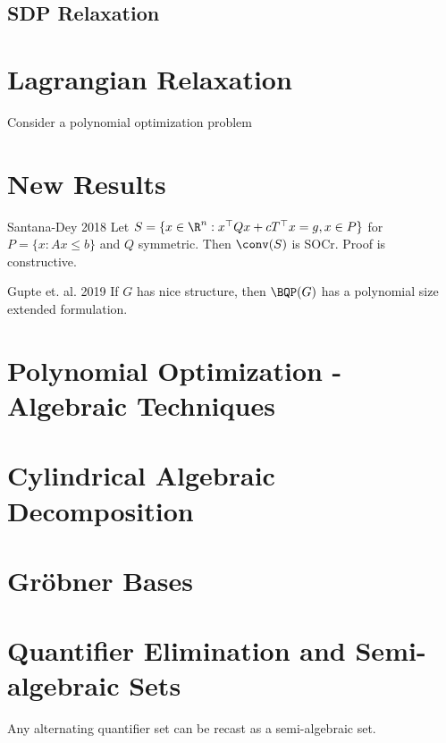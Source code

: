 \subsection{SDP Relaxation}



\section{Lagrangian Relaxation}


Consider a polynomial optimization problem 

\section{New Results}

\begin{theorem}{Santana-Dey 2018}{}
Let $S = \{x \in \R^n : x^\top Q x + cT^\top x = g, x \in P\}$  for $P = \{x : Ax \leq b\}$ and $Q$ symmetric.  Then $\conv(S)$ is SOCr.  Proof is constructive.
\end{theorem}

\begin{theorem}{Gupte et. al. 2019}{}
If $G$ has nice structure, then $\BQP(G)$ has a polynomial size extended formulation.
\end{theorem}
\section{Polynomial Optimization - Algebraic Techniques}

\section{Cylindrical Algebraic Decomposition}


\section{Gr\"obner Bases}

\section{Quantifier Elimination and Semi-algebraic Sets}

\begin{theorem}{}{}
Any alternating quantifier set can be recast as a semi-algebraic set.
\end{theorem}




